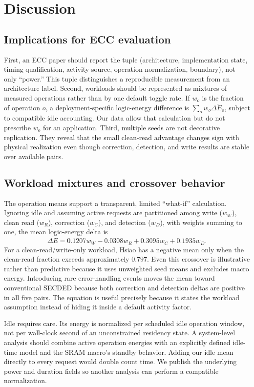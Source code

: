 \documentclass[conference,10pt]{IEEEtran}
\begin{document}
\section{Discussion}
\subsection{Implications for ECC evaluation}
First, an ECC paper should report the tuple (architecture, implementation state, timing qualification, activity source, operation normalization, boundary), not only ``power.'' This tuple distinguishes a reproducible measurement from an architecture label. Second, workloads should be represented as mixtures of measured operations rather than by one default toggle rate. If $w_o$ is the fraction of operation $o$, a deployment-specific logic-energy difference is $\sum_o w_o\overline{\Delta E_o}$, subject to compatible idle accounting. Our data allow that calculation but do not prescribe $w_o$ for an application. Third, multiple seeds are not decorative replication. They reveal that the small clean-read advantage changes sign with physical realization even though correction, detection, and write results are stable over available pairs.

\subsection{Workload mixtures and crossover behavior}
The operation means support a transparent, limited ``what-if'' calculation. Ignoring idle and assuming active requests are partitioned among write ($w_W$), clean read ($w_R$), correction ($w_C$), and detection ($w_D$), with weights summing to one, the mean logic-energy delta is
\begin{equation}
 \overline{\Delta E}=0.1207w_W-0.0308w_R+0.3095w_C+0.1935w_D.
\end{equation}
For a clean-read/write-only workload, Hsiao has a negative mean only when the clean-read fraction exceeds approximately $0.797$. Even this crossover is illustrative rather than predictive because it uses unweighted seed means and excludes macro energy. Introducing rare error-handling events moves the mean toward conventional SECDED because both correction and detection deltas are positive in all five pairs. The equation is useful precisely because it states the workload assumption instead of hiding it inside a default activity factor.

Idle requires care. Its energy is normalized per scheduled idle operation window, not per wall-clock second of an unconstrained residency state. A system-level analysis should combine active operation energies with an explicitly defined idle-time model and the SRAM macro's standby behavior. Adding our idle mean directly to every request would double count time. We publish the underlying power and duration fields so another analysis can perform a compatible normalization.
\end{document}

